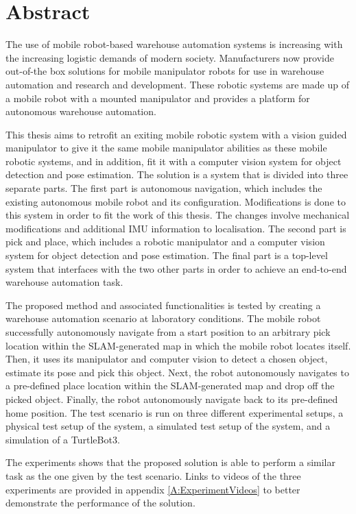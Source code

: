 \chapter*{Abstract}


The use of mobile robot-based warehouse automation systems is increasing with the increasing logistic demands of modern society. Manufacturers now provide out-of-the box solutions for mobile manipulator robots for use in warehouse automation and research and development. These robotic systems are made up of a mobile robot with a mounted manipulator and provides a platform for autonomous warehouse automation.

This thesis aims to retrofit an exiting mobile robotic system with a vision guided manipulator to give it the same mobile manipulator abilities as these mobile robotic systems, and in addition, fit it with a computer vision system for object detection and pose estimation. The solution is a system that is  divided into three separate parts. The first part is autonomous navigation, which includes the existing autonomous mobile robot and its configuration. Modifications is done to this system in order to fit the work of this thesis. The changes involve mechanical modifications and additional IMU information to localisation. The second part is pick and place, which includes a robotic manipulator and a computer vision system for object detection and pose estimation. The final part is a top-level system that interfaces with the two other parts in order to achieve an end-to-end warehouse automation task.

The proposed method and associated functionalities is tested by creating a warehouse automation scenario at laboratory conditions. The mobile robot successfully autonomously navigate from a start position to an arbitrary pick location within the SLAM-generated map in which the mobile robot locates itself. Then, it uses its manipulator and computer vision to detect a chosen object, estimate its pose and pick this object. Next, the robot autonomously navigates to a pre-defined place location within the SLAM-generated map and drop off the picked object. Finally, the robot autonomously navigate back to its pre-defined home position. The test scenario is run on three different experimental setups, a physical test setup of the system, a simulated test setup of the system, and a simulation of a TurtleBot3.

The experiments shows that the proposed solution is able to perform a similar task as the one given by the test scenario. Links to videos of the three experiments are provided in appendix \ref{A:ExperimentVideos} to better demonstrate the performance of the solution.

